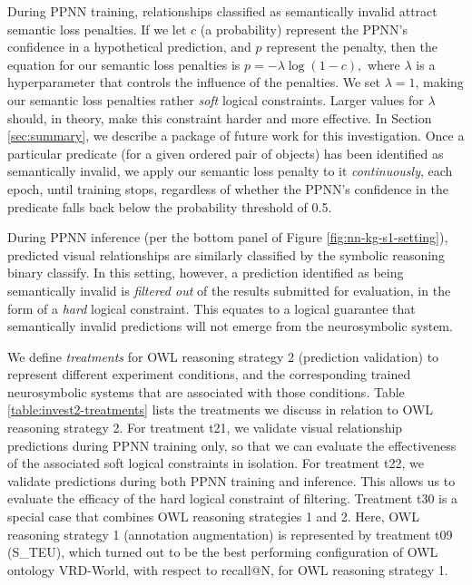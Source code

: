 \documentclass[]{jair}
\begin{document}
During PPNN training, relationships classified as semantically invalid attract semantic loss penalties.
If we let $c$ (a probability) represent the PPNN's confidence in a hypothetical prediction, and $p$ represent the penalty, then the equation for our semantic loss penalties is $p = - \lambda \log(1 - c),$ where $\lambda$ is a hyperparameter that controls the influence of the penalties.
We set $\lambda = 1$, making our semantic loss penalties rather \emph{soft} logical constraints.
Larger values for $\lambda$ should, in theory, make this constraint harder and more effective.
In Section \ref{sec:summary}, we describe a package of future work for this investigation.
Once a particular predicate (for a given ordered pair of objects) has been identified as semantically invalid, we apply our semantic loss penalty to it \emph{continuously}, each epoch, until training stops, regardless of whether the PPNN's confidence in the predicate falls back below the probability threshold of 0.5.

During PPNN inference (per the bottom panel of Figure \ref{fig:nn-kg-s1-setting}), predicted visual relationships are similarly classified by the symbolic reasoning binary classify.
In this setting, however, a prediction identified as being semantically invalid is \emph{filtered out} of the results submitted for evaluation, in the form of a \emph{hard} logical constraint.
This equates to a logical guarantee that semantically invalid predictions will not emerge from the neurosymbolic system.

We define \emph{treatments} for OWL reasoning strategy 2 (prediction validation) to represent different experiment conditions, and the corresponding trained neurosymbolic systems that are associated with those conditions.
Table \ref{table:invest2-treatments} lists the treatments we discuss in relation to OWL reasoning strategy 2.
For treatment t21, we validate visual relationship predictions during PPNN training only, so that we can evaluate the effectiveness of the associated soft logical constraints in isolation.
For treatment t22, we validate predictions during both PPNN training and inference.
This allows us to evaluate the efficacy of the hard logical constraint of filtering.
Treatment t30 is a special case that combines OWL reasoning strategies 1 and 2.
Here, OWL reasoning strategy 1 (annotation augmentation) is represented by treatment t09 (S\_TEU), which turned out to be the best performing configuration of OWL ontology VRD-World, with respect to recall@N, for OWL reasoning strategy 1.
\end{document}
